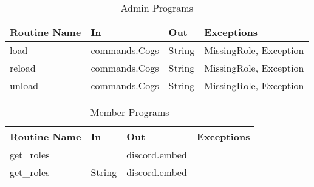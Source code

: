 \documentclass[12pt, titlepage]{article}
\begin{document}
\begin{table}[!htb]
    \centering
    \begin{tabular}{|p{3cm}|p{3cm}|p{3cm}|p{4.5cm}|}
        \hline
        \textbf{Routine Name} & \textbf{In} & \textbf{Out} & \textbf{Exceptions} \\
        \hline
        load & commands.Cogs & String & MissingRole, Exception \\
        \hline
        reload & commands.Cogs & String & MissingRole, Exception \\
        \hline
        unload & commands.Cogs & String & MissingRole, Exception \\
        \hline
    \end{tabular}
    \caption{Admin Programs}
    \label{tab:admin}
\end{table}

\begin{table}[!htb]
    \centering
    \begin{tabular}{|p{3cm}|p{3cm}|p{3cm}|p{4.5cm}|}
        \hline
        \textbf{Routine Name} & \textbf{In} & \textbf{Out} & \textbf{Exceptions} \\
        \hline
        get\_roles & & discord.embed & \\
        \hline
        get\_roles & String & discord.embed & \\
        \hline
    \end{tabular}
    \caption{Member Programs}
    \label{tab:members}
\end{table}
\end{document}
